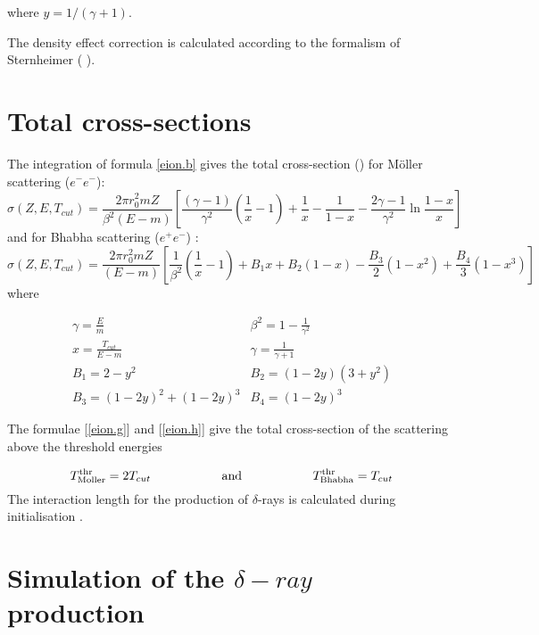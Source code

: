 where $ y = 1/(\gamma+1) $.

The density effect correction is calculated according to the
 formalism of Sternheimer ( \cite{eion.sternheimer}). 

\section{Total cross-sections}
The integration of formula \ref{eion.b} gives the total cross-section
 (\cite{eion.messel}) for M\"{o}ller scattering ($e^- e^-$):
\begin{equation}
\label{eion.g}
\sigma ( Z,E,T_{cut} ) =\frac {2 \pi r_0^2 mZ}{\beta^2(E-m)}
 \left[\frac{(\gamma-1)} {\gamma^2}\left(\frac{1}{x}-1\right)
             +\frac{1}{x}-\frac{1}{1-x}-\frac{2\gamma-1}{\gamma^2}\ln
\frac{1-x}{x}\right]
\end{equation}
and for Bhabha scattering ($e^+ e^-$) :
\begin{equation}
\label{eion.h}
\sigma (Z,E,T_{cut}) =\frac{ 2 \pi r^2_0  mZ }
      {(E-m)}\left [\frac {1 }{\beta^2}  \left(\frac{1}{x}-1\right)
  + B_1 x + B_2 (1-x) -
 \frac {B_3 } {2} ( 1-x^2 ) +\frac{B_4}{3}(1-x^3)\right]
\end{equation}
where

\[
\begin{array}{ll}
\gamma = \frac{E}{m}       & \beta^2 = 1-\frac{1}{\gamma^2} \\ [.2cm]
 x     =\frac {T_{cut}}{E-m}  & \gamma=\frac{1}{\gamma + 1} \\ [.2cm]
 B_1=2-y^2                 &  B_2=(1-2y)(3+y^2)              \\ [.2cm]
B_3=(1-2y)^2+(1-2y)^3      &  B_4=(1-2y)^3
\end{array}
\]

The formulae [\ref{eion.g}] and [\ref{eion.h}]
give the total cross-section of the scattering
above the threshold energies

\begin{equation}
T_{\rm Moller}^{\rm thr} =2T_{cut}  \mbox{\hspace{2cm}and\hspace{2cm}}
T_{\rm Bhabha}^{\rm thr} = T_{cut}
\end{equation}
The interaction length for the production of $\delta$-rays is calculated
during initialisation .

\section{Simulation of the $\delta -ray$ production}
